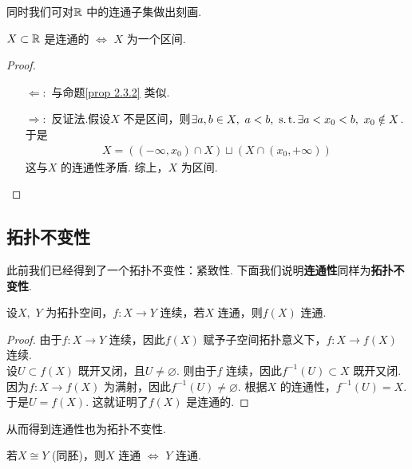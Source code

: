 	\vspace*{2em}
	同时我们可对$\mathbb{R}$ 中的连通子集做出刻画.
	\begin{proposition}
		$X \subset \mathbb{R}$ 是连通的 $\Leftrightarrow$ $X$ 为一个区间.
		
		\vspace*{2em}
		\begin{proof}
			\begin{enumerate}
				\item[$\Leftarrow:$]与命题\ref{prop 2.3.2} 类似.
				
				\item[$\Rightarrow:$]反证法.假设$X$ 不是区间，则$\exists a , b \in X , \,\, a < b , \,\, \operatorname{s.t.} \exists a < x_0 < b , \,\, x_0 \notin X$. 于是
				\begin{align}
					X = ((-\infty , x_0) \cap X) \sqcup (X \cap (x_0 , +\infty))
				\end{align}
				这与$X$ 的连通性矛盾. 综上，$X$ 为区间.
			\end{enumerate}
		\end{proof}
	\end{proposition}

\newpage
\subsection{拓扑不变性}
	此前我们已经得到了一个拓扑不变性：紧致性. 下面我们说明\textbf{连通性}同样为\textbf{拓扑不变性}.
	\begin{proposition}
		设$X , \,\, Y$ 为拓扑空间，$f : X \longrightarrow Y$ 连续，若$X$ 连通，则$f(X)$ 连通.
		
		\vspace*{2em}
		\begin{proof}
			由于$f : X \longrightarrow Y$ 连续，因此$f(X)$ 赋予子空间拓扑意义下，$f : X \longrightarrow f(X)$ 连续.\\
			设$U \subset f(X)$ 既开又闭，且$U \neq \varnothing$. 则由于$f$ 连续，因此$f^{-1}(U) \subset X$ 既开又闭.\\
			因为$f : X \longrightarrow f(X)$ 为满射，因此$f^{-1}(U) \neq \varnothing$. 根据$X$ 的连通性，$f^{-1}(U) = X$.\\
			于是$U = f(X)$. 这就证明了$f(X)$ 是连通的.
		\end{proof}
	\end{proposition}
	
	从而得到连通性也为拓扑不变性.
	\begin{corollary}
		若$X \cong Y$ (同胚)，则$X$ 连通 $\Leftrightarrow$ $Y$ 连通.
	\end{corollary}
	
